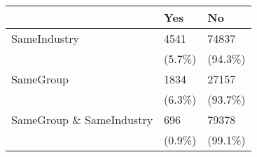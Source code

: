 \begin{tabular}{lll}
\toprule
{} &     Yes &       No \\
\midrule
SameIndustry             &    4541 &    74837 \\
                         &  (5.7\%) &  (94.3\%) \\
SameGroup                &    1834 &    27157 \\
                         &  (6.3\%) &  (93.7\%) \\
SameGroup \& SameIndustry &     696 &    79378 \\
                         &  (0.9\%) &  (99.1\%) \\
\bottomrule
\end{tabular}
